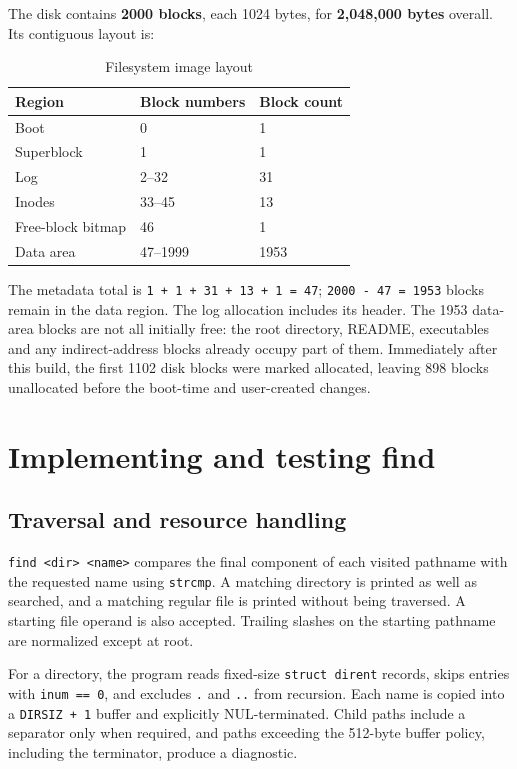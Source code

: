 \documentclass{../latex/utmreport}
\begin{document}
The disk contains \textbf{2000 blocks}, each 1024 bytes, for
\textbf{2,048,000 bytes} overall. Its contiguous layout is:

{
\begin{table}[H]
\centering
\caption{Filesystem image layout}
\begin{tabular}{lll}
\hline
Region & Block numbers & Block count \\
\hline


Boot & 0 & 1 \\
Superblock & 1 & 1 \\
Log & 2--32 & 31 \\
Inodes & 33--45 & 13 \\
Free-block bitmap & 46 & 1 \\
Data area & 47--1999 & 1953 \\
\end{tabular}
\end{table}
}

The metadata total is \texttt{1\ +\ 1\ +\ 31\ +\ 13\ +\ 1\ =\ 47};
\texttt{2000\ -\ 47\ =\ 1953} blocks remain in the data region. The log
allocation includes its header. The 1953 data-area blocks are not all
initially free: the root directory, README, executables and any
indirect-address blocks already occupy part of them. Immediately after
this build, the first 1102 disk blocks were marked allocated, leaving
898 blocks unallocated before the boot-time and user-created changes.

\chapter{Implementing and testing
find}\label{implementing-and-testing-find}

\section{Traversal and resource
handling}\label{traversal-and-resource-handling}

\texttt{find\ \textless{}dir\textgreater{}\ \textless{}name\textgreater{}}
compares the final component of each visited pathname with the requested
name using \texttt{strcmp}. A matching directory is printed as well as
searched, and a matching regular file is printed without being
traversed. A starting file operand is also accepted. Trailing slashes on
the starting pathname are normalized except at root.

For a directory, the program reads fixed-size \texttt{struct\ dirent}
records, skips entries with \texttt{inum\ ==\ 0}, and excludes
\texttt{.} and \texttt{..} from recursion. Each name is copied into a
\texttt{DIRSIZ\ +\ 1} buffer and explicitly NUL-terminated. Child paths
include a separator only when required, and paths exceeding the 512-byte
buffer policy, including the terminator, produce a diagnostic.
\end{document}

